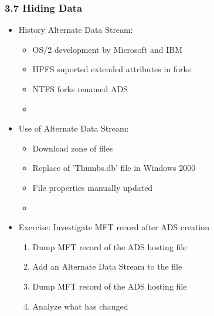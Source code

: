 \begin{frame}[fragile]
  \frametitle{3.7 Hiding Data}
    \begin{itemize}
       \item History Alternate Data Stream:
       \begin{itemize}
           \item OS/2 development by Microsoft and IBM
           \item HPFS suported extended attributes in forks
           \item NTFS forks renamed ADS
           \item[]
       \end{itemize}
       \item Use of Alternate Data Stream:
       \begin{itemize}
           \item Download zone of files
           \item Replace of 'Thumbs.db' file in Windows 2000
           \item File properties manually updated
           \item[]
       \end{itemize}
       \item Exercise: Investigate MFT record after ADS creation
       \begin{enumerate}
           \item Dump MFT record of the ADS hosting file
           \item Add an Alternate Data Stream to the file
           \item Dump MFT record of the ADS hosting file
           \item Analyze what has changed
       \end{enumerate}
    \end{itemize}
\end{frame}



